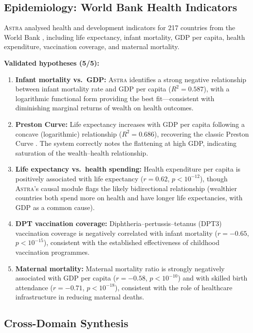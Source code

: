 \documentclass[usenatbib]{rasti}
\newcommand{\astra}{\textsc{Astra}\xspace}
\begin{document}
\subsection{Epidemiology: World Bank Health Indicators}
\label{sec:crossdomain:epidemiology}

\astra analysed health and development indicators for 217 countries from the World Bank \citep{WorldBank2024}, including life expectancy, infant mortality, GDP per capita, health expenditure, vaccination coverage, and maternal mortality.

\textbf{Validated hypotheses (5/5):}
\begin{enumerate}
  \item[(i)] \textbf{Infant mortality vs.\ GDP:} \astra identifies a strong negative relationship between infant mortality rate and GDP per capita ($R^{2} = 0.587$), with a logarithmic functional form providing the best fit---consistent with diminishing marginal returns of wealth on health outcomes.
  \item[(ii)] \textbf{Preston Curve:} Life expectancy increases with GDP per capita following a concave (logarithmic) relationship ($R^{2} = 0.686$), recovering the classic Preston Curve \citep{Preston1975}. The system correctly notes the flattening at high GDP, indicating saturation of the wealth--health relationship.
  \item[(iii)] \textbf{Life expectancy vs.\ health spending:} Health expenditure per capita is positively associated with life expectancy ($r = 0.62$, $p < 10^{-12}$), though \astra's causal module flags the likely bidirectional relationship (wealthier countries both spend more on health and have longer life expectancies, with GDP as a common cause).
  \item[(iv)] \textbf{DPT vaccination coverage:} Diphtheria--pertussis--tetanus (DPT3) vaccination coverage is negatively correlated with infant mortality ($r = -0.65$, $p < 10^{-15}$), consistent with the established effectiveness of childhood vaccination programmes.
  \item[(v)] \textbf{Maternal mortality:} Maternal mortality ratio is strongly negatively associated with GDP per capita ($r = -0.58$, $p < 10^{-10}$) and with skilled birth attendance ($r = -0.71$, $p < 10^{-18}$), consistent with the role of healthcare infrastructure in reducing maternal deaths.
\end{enumerate}

\subsection{Cross-Domain Synthesis}
\label{sec:crossdomain:synthesis}
\end{document}
